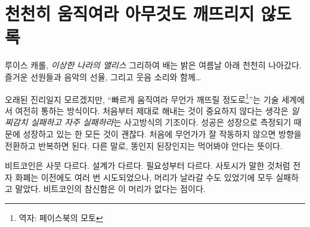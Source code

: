 \chapter{천천히 움직여라 아무것도 깨뜨리지 않도록}
\label{les:18}

\begin{chapquote}{루이스 캐롤, \textit{이상한 나라의 앨리스}}
	그리하여 배는 밝은 여름날 아래 천천히 나아갔다. 즐거운 선원들과 음악의 선율, 그리고 웃음 소리와 함께\ldots
\end{chapquote}

\begin{comment}
	It might be a dead mantra, but \enquote{move fast and break things} is still how
	much of the tech world operates. The idea that it doesn't matter if you
	get things right the first time is a basic pillar of the \textit{fail early,
		fail often} mentality. Success is measured in growth, so as long as you
	are growing everything is fine. If something doesn't work at first you
	simply pivot and iterate. In other words: throw enough shit against the
	wall and see what sticks.
\end{comment}
오래된 진리일지 모르겠지만, \enquote{빠르게 움직여라 무언가 깨뜨릴 정도로\footnote{역자: 페이스북의 모토}}는 기술 세계에서 여전히 통하는 방식이다.
처음부터 제대로 해내는 것이 중요하지 않다는 생각은 \textit{일찌감치 실패하고 자주 실패하라}는 사고방식의 기조이다.
성공은 성장으로 측정되기 때문에 성장하고 있는 한 모든 것이 괜찮다. 
처음에 무언가가 잘 작동하지 않으면 방향을 전환하고 반복하면 된다. 
다른 말로, 똥인지 된장인지는 먹어봐야 안다는 뜻이다.

\begin{comment}
	Bitcoin is very different. It is different by design. It is different
	out of necessity. As Satoshi pointed out, e-currency has been tried
	many times before, and all previous attempts have failed because there
	was a head which could be cut off. The novelty of Bitcoin is that it is
	a beast without heads.
\end{comment}
비트코인은 사뭇 다르다. 설계가 다르다. 필요성부터 다르다.
사토시가 말한 것처럼 전자 화폐는 이전에도 여러 번 시도되었으나, 머리가 날라갈 수도 있었기에 모두 실패하고 말았다.
비트코인의 참신함은 이 머리가 없다는 점이다.

